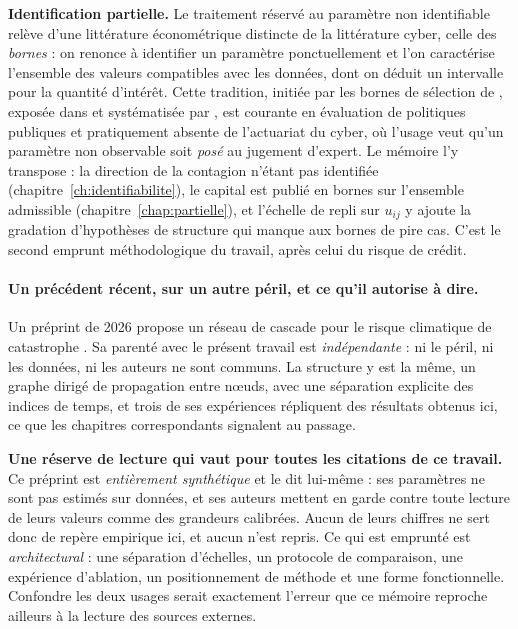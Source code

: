 \textbf{Identification partielle.} Le traitement réservé au paramètre non identifiable relève
d'une littérature économétrique distincte de la littérature cyber, celle des \emph{bornes} : on
renonce à identifier un paramètre ponctuellement et l'on caractérise l'ensemble des valeurs
compatibles avec les données, dont on déduit un intervalle pour la quantité d'intérêt. Cette
tradition, initiée par les bornes de sélection de \citet{Manski1990}, exposée dans
\citet{Manski1995} et systématisée par \citet{Tamer2010}, est courante en évaluation de politiques publiques et pratiquement absente
de l'actuariat du cyber, où l'usage veut qu'un paramètre non observable soit \emph{posé} au
jugement d'expert. Le mémoire l'y transpose : la direction de la contagion n'étant pas
identifiée (chapitre~\ref{ch:identifiabilite}), le capital est publié en bornes sur l'ensemble
admissible (chapitre~\ref{chap:partielle}), et l'échelle de repli sur $u_{ij}$ y ajoute la
gradation d'hypothèses de structure qui manque aux bornes de pire cas. C'est le second emprunt
méthodologique du travail, après celui du risque de crédit.

\paragraph{Un précédent récent, sur un autre péril, et ce qu'il autorise à dire.} Un préprint de
2026 propose un réseau de cascade pour le risque climatique de catastrophe
\citep{ccrn2026}. Sa parenté avec le présent travail est \emph{indépendante} : ni le péril,
ni les données, ni les auteurs ne sont communs. La structure y est la même, un graphe dirigé de propagation entre n\oe uds, avec une
séparation explicite des indices de temps, et trois de ses expériences répliquent des résultats
obtenus ici, ce que les chapitres correspondants signalent au passage.

\begin{attention}
\textbf{Une réserve de lecture qui vaut pour toutes les citations de ce travail.} Ce préprint est
\emph{entièrement synthétique} et le dit lui-même : ses paramètres ne sont pas estimés sur
données, et ses auteurs mettent en garde contre toute lecture de leurs valeurs comme des
grandeurs calibrées. Aucun de leurs chiffres ne sert donc de repère empirique ici, et
aucun n'est repris. Ce qui est emprunté est \emph{architectural} : une séparation d'échelles, un
protocole de comparaison, une expérience d'ablation, un positionnement de méthode et une forme
fonctionnelle. Confondre les deux usages serait exactement l'erreur que ce mémoire reproche
ailleurs à la lecture des sources externes.
\end{attention}


